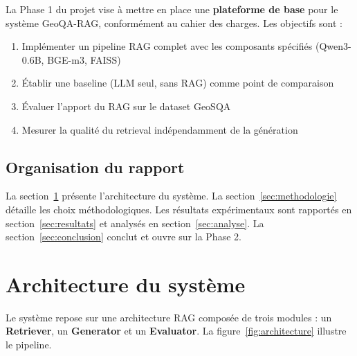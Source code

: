 \documentclass[12pt,a4paper]{article}
\begin{document}
La Phase 1 du projet vise à mettre en place une \textbf{plateforme de base} pour le système GeoQA-RAG, conformément au cahier des charges. Les objectifs sont :
\begin{enumerate}[leftmargin=*]
  \item Implémenter un pipeline RAG complet avec les composants spécifiés (Qwen3-0.6B, BGE-m3, FAISS)
  \item Établir une baseline (LLM seul, sans RAG) comme point de comparaison
  \item Évaluer l'apport du RAG sur le dataset GeoSQA~\cite{huang_geosqa_2019}
  \item Mesurer la qualité du retrieval indépendamment de la génération
\end{enumerate}

\subsection{Organisation du rapport}

La section~\ref{sec:architecture} présente l'architecture du système. La section~\ref{sec:methodologie} détaille les choix méthodologiques. Les résultats expérimentaux sont rapportés en section~\ref{sec:resultats} et analysés en section~\ref{sec:analyse}. La section~\ref{sec:conclusion} conclut et ouvre sur la Phase 2.

\section{Architecture du système}
\label{sec:architecture}

Le système repose sur une architecture RAG composée de trois modules : un \textbf{Retriever}, un \textbf{Generator} et un \textbf{Evaluator}. La figure~\ref{fig:architecture} illustre le pipeline.
\end{document}
